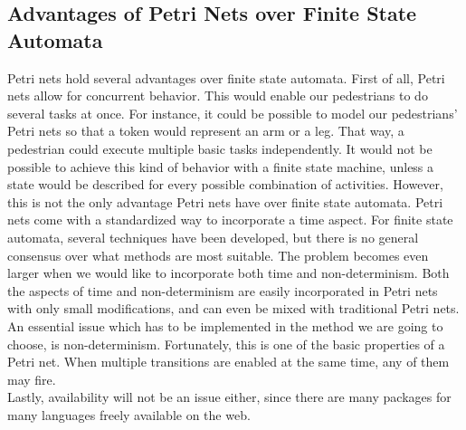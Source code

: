 \documentclass[11pt]{book}
\begin{document}
\subsection{Advantages of Petri Nets over Finite State Automata}
Petri nets hold several advantages over finite state automata. First of all, Petri nets allow for concurrent behavior. This would enable our pedestrians to do several tasks at once. For instance, it could be possible to model our pedestrians' Petri nets so that a token would represent an arm or a leg. That way, a pedestrian could execute multiple basic tasks independently. It would not be possible to achieve this kind of behavior with a finite state machine, unless a state would be described for every possible combination of activities.
However, this is not the only advantage Petri nets have over finite state automata. Petri nets come with a standardized way to incorporate a time aspect. For finite state automata, several techniques have been developed, but there is no general consensus over what methods are most suitable. The problem becomes even larger when we would like to incorporate both time and non-determinism. Both the aspects of time and non-determinism are easily incorporated in Petri nets with only small modifications, and can even be mixed with traditional Petri nets.
An essential issue which has to be implemented in the method we are going to choose, is non-determinism. Fortunately, this is one of the basic properties of a Petri net. When multiple transitions are enabled at the same time, any of them may fire.\\
Lastly, availability will not be an issue either, since there are many packages for many languages freely available on the web.
\end{document}
